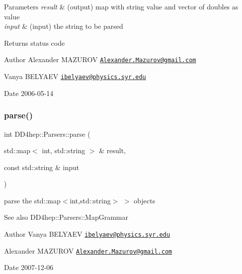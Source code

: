 \begin{DoxyParams}{Parameters}
{\em result} & (output) map with string value and vector of doubles as value \\
\hline
{\em input} & (input) the string to be parsed \\
\hline
\end{DoxyParams}
\begin{DoxyReturn}{Returns}
status code
\end{DoxyReturn}
\begin{DoxyAuthor}{Author}
Alexander M\+A\+Z\+U\+R\+OV \href{mailto:Alexander.Mazurov@gmail.com}{\tt Alexander.\+Mazurov@gmail.\+com} 

Vanya B\+E\+L\+Y\+A\+EV \href{mailto:ibelyaev@physics.syr.edu}{\tt ibelyaev@physics.\+syr.\+edu} 
\end{DoxyAuthor}
\begin{DoxyDate}{Date}
2006-\/05-\/14 
\end{DoxyDate}
\hypertarget{namespace_d_d4hep_1_1_parsers_a3d922ac85001241814312a94a6ccdbc3}{}\label{namespace_d_d4hep_1_1_parsers_a3d922ac85001241814312a94a6ccdbc3} 
\subsubsection{\texorpdfstring{parse()}{parse()}\hspace{0.1cm}{\footnotesize\ttfamily [14/21]}}
{\footnotesize\ttfamily int D\+D4hep\+::\+Parsers\+::parse (\begin{DoxyParamCaption}\item[{std\+::map$<$ int, std\+::string $>$ \&}]{result,  }\item[{const std\+::string \&}]{input }\end{DoxyParamCaption})}



parse the {\ttfamily std\+::map$<$int,std\+::string$>$ $>$} objects 

\begin{DoxySeeAlso}{See also}
D\+D4hep\+::\+Parsers\+::\+Map\+Grammar 
\end{DoxySeeAlso}
\begin{DoxyAuthor}{Author}
Vanya B\+E\+L\+Y\+A\+EV \href{mailto:ibelyaev@physics.syr.edu}{\tt ibelyaev@physics.\+syr.\+edu} 

Alexander M\+A\+Z\+U\+R\+OV \href{mailto:Alexander.Mazurov@gmail.com}{\tt Alexander.\+Mazurov@gmail.\+com} 
\end{DoxyAuthor}
\begin{DoxyDate}{Date}
2007-\/12-\/06 
\end{DoxyDate}
\hypertarget{namespace_d_d4hep_1_1_parsers_a62f00a034a77a322187e7cd94418f696}{}\label{namespace_d_d4hep_1_1_parsers_a62f00a034a77a322187e7cd94418f696} 
